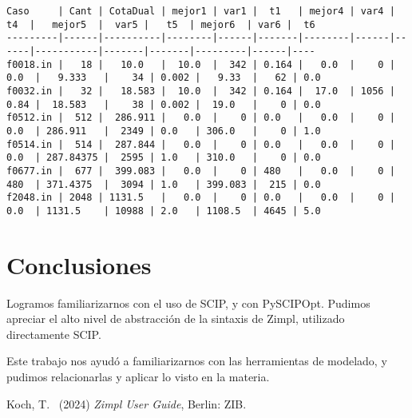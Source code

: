\documentclass[11pt, a4paper, pdftex]{article}
\begin{document}
\begin{turn}{90}
\begin{minipage}{\textheight}
\begin{verbatim}
Caso     | Cant | CotaDual | mejor1 | var1 |  t1   | mejor4 | var4 |  t4  |   mejor5  |  var5 |   t5  | mejor6  | var6 |  t6
---------|------|----------|--------|------|-------|--------|------|------|-----------|-------|-------|---------|------|----
f0018.in |   18 |   10.0   |  10.0  |  342 | 0.164 |   0.0  |    0 | 0.0  |   9.333   |    34 | 0.002 |   9.33  |   62 | 0.0
f0032.in |   32 |   18.583 |  10.0  |  342 | 0.164 |  17.0  | 1056 | 0.84 |  18.583   |    38 | 0.002 |  19.0   |    0 | 0.0
f0512.in |  512 |  286.911 |   0.0  |    0 | 0.0   |   0.0  |    0 | 0.0  | 286.911   |  2349 | 0.0   | 306.0   |    0 | 1.0
f0514.in |  514 |  287.844 |   0.0  |    0 | 0.0   |   0.0  |    0 | 0.0  | 287.84375 |  2595 | 1.0   | 310.0   |    0 | 0.0
f0677.in |  677 |  399.083 |   0.0  |    0 | 480   |   0.0  |    0 | 480  | 371.4375  |  3094 | 1.0   | 399.083 |  215 | 0.0
f2048.in | 2048 | 1131.5   |   0.0  |    0 | 0.0   |   0.0  |    0 | 0.0  | 1131.5    | 10988 | 2.0   | 1108.5  | 4645 | 5.0
\end{verbatim}
\end{minipage}
\end{turn}

\newpage
\section{Conclusiones}

Logramos familiarizarnos con el uso de SCIP, y con PySCIPOpt.
Pudimos apreciar el alto nivel de abstracción de la sintaxis de Zimpl, utilizado directamente SCIP.

Este trabajo nos ayudó a familiarizarnos con las herramientas de modelado, y
pudimos relacionarlas y aplicar lo visto en la materia.

\begin{thebibliography}{99}
	Koch, T.\
	(2024)
	\emph{Zimpl User Guide},
	Berlin: ZIB.
\end{thebibliography}
\end{document}
